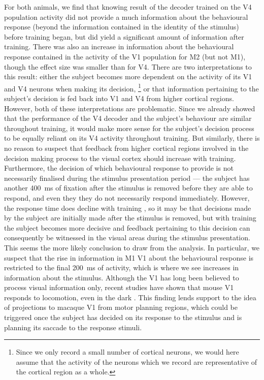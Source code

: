 For both animals, we find that knowing result of the decoder trained on the \ac{V4} population activity did not provide a much information about the behavioural response (beyond the information contained in the identity of the stimulus) before training began, but did yield a significant amount of information after training.
There was also an increase in information about the behavioural response contained in the activity of the \ac{V1} population for \ac{M2} (but not \ac{M1}), though the effect size was smaller than for \ac{V4}.
There are two interpretations to this result: either the subject becomes more dependent on the activity of its \ac{V1} and \ac{V4} neurons when making its decision,%
\footnote{Since we only record a small number of cortical neurons, we would here assume that the activity of the neurons which we record are representative of the cortical region as a whole.}
or that information pertaining to the subject's decision is fed back into \ac{V1} and \ac{V4} from higher cortical regions.
However, both of these interpretations are problematic.
Since we already showed that the performance of the \ac{V4} decoder and the subject's behaviour are similar throughout training, it would make more sense for the subject's decision process to be equally reliant on its \ac{V4} activity throughout training.
But similarly, there is no reason to suspect that feedback from higher cortical regions involved in the decision making process to the visual cortex should increase with training.
Furthermore, the decision of which behavioural response to provide is not necessarily finalised during the stimulus presentation period --- the subject has another \SI{400}{\milli\second} of fixation after the stimulus is removed before they are able to respond, and even they they do not necessarily respond immediately.
However, the response time does decline with training \citep{Chen2013,Chen2013thesis}, so it may be that decisions made by the subject are initially made after the stimulus is removed, but with training the subject becomes more decisive and feedback pertaining to this decision can consequently be witnessed in the visual areas during the stimulus presentation.
This seems the more likely conclusion to draw from the analysis.
In particular, we suspect that the rise in information in \ac{M1} \ac{V1} about the behavioural response is restricted to the final \SI{200}{\milli\second} of activity, which is where we see increases in information about the stimulus.
Although the \acl{V1} has long been believed to process visual information only, recent studies have shown that mouse \ac{V1} responds to locomotion, even in the dark \citep{Pakan2016,Saleem2013,Keller2012}.
This finding lends support to the idea of projections to macaque \ac{V1} from motor planning regions, which could be triggered once the subject has decided on its response to the stimulus and is planning its saccade to the response stimuli.
